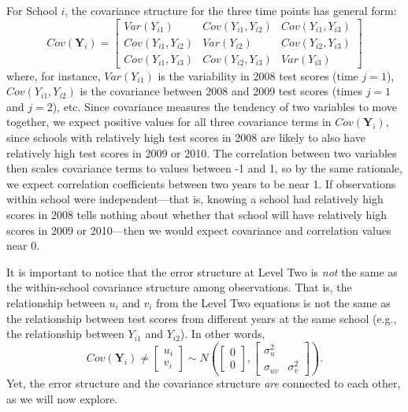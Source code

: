 \documentclass[
]{krantz}
\begin{document}
For School \(i\), the covariance structure for the three time points has general form:
\[ Cov(\mathbf{Y}_i) =  \left[
          \begin{array}{cccc}
            Var(Y_{i1}) & Cov(Y_{i1},Y_{i2}) & Cov(Y_{i1},Y_{i3}) \\
            Cov(Y_{i1},Y_{i2}) & Var(Y_{i2}) & Cov(Y_{i2},Y_{i3}) \\
            Cov(Y_{i1},Y_{i3}) & Cov(Y_{i2},Y_{i3}) & Var(Y_{i3})
          \end{array} \right] \]
where, for instance, \(Var(Y_{i1})\) is the variability in 2008 test scores (time \(j=1\)), \(Cov(Y_{i1},Y_{i2})\) is the covariance between 2008 and 2009 test scores (times \(j=1\) and \(j=2\)), etc. Since covariance measures the tendency of two variables to move together, we expect positive values for all three covariance terms in \(Cov(\mathbf{Y}_i)\), since schools with relatively high test scores in 2008 are likely to also have relatively high test scores in 2009 or 2010. The correlation between two variables then scales covariance terms to values between -1 and 1, so by the same rationale, we expect correlation coefficients between two years to be near 1. If observations within school were independent---that is, knowing a school had relatively high scores in 2008 tells nothing about whether that school will have relatively high scores in 2009 or 2010---then we would expect covariance and correlation values near 0.

It is important to notice that the error structure at Level Two is \emph{not} the same as the within-school covariance structure among observations. That is, the relationship between \(u_{i}\) and \(v_{i}\) from the Level Two equations is not the same as the relationship between test scores from different years at the same school (e.g., the relationship between \(Y_{i1}\) and \(Y_{i2}\)). In other words,
\[ Cov(\mathbf{Y}_i) \neq \left[ \begin{array}{c}
            u_{i} \\ v_{i}
          \end{array}  \right] \sim N \left( \left[
          \begin{array}{c}
            0 \\ 0
          \end{array} \right], \left[
          \begin{array}{cc}
            \sigma_{u}^{2} & \\
            \sigma_{uv} & \sigma_{v}^{2}
          \end{array} \right] \right) . \]
Yet, the error structure and the covariance structure \emph{are} connected to each other, as we will now explore.
\end{document}
